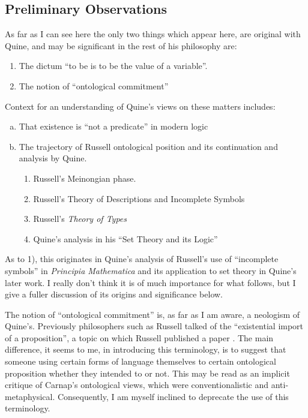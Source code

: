 \documentclass[10pt,titlepage]{book}
\begin{document}
\subsection{Preliminary Observations}
  
As far as I can see here the only two things which appear here, are original with Quine, and may be significant in the rest of his philosophy are:

\begin{enumerate}
\item The dictum ``to be is to be the value of a variable''.
\item The notion of ``ontological commitment'' 
\end{enumerate}

Context for an understanding of Quine's views on these matters includes:
\begin{enumerate}[(a)]
\item That existence is ``not a predicate'' in modern logic
\item The trajectory of Russell ontological position and its continuation and analysis by Quine. 
  \begin{enumerate}[i]
  \item Russell's Meinongian phase.
  \item Russell's Theory of Descriptions \cite{russell1956,russellOD} and Incomplete Symbols \cite{russell10}
  \item Russell's {\it Theory of Types} \cite{russell1908}
  \item Quine's analysis in his ``Set Theory and its Logic'' \cite{quineSTAIL}
  \end{enumerate}
\end{enumerate}

As to 1), this originates in Quine's analysis of Russell's use of ``incomplete symbols'' in \emph{Principia Mathematica} \cite{russell10} and its application to set theory in Quine's later work.
I really don't think it is of much importance for what follows, but I give a fuller discussion of its origins and significance below.

The notion of ``ontological commitment'' is, as far as I am aware, a neologism of Quine's.
Previously philosophers such as Russell talked of the ``existential import of a proposition'', a topic on which Russell published a paper \cite{russell-existential}.
The main difference, it seems to me, in introducing this terminology, is to suggest that someone using certain forms of language themselves to certain ontological proposition whether they intended to or not.
This may be read as an implicit critique of Carnap's ontological views, which were conventionalistic and anti-metaphysical.
Consequently, I am myself inclined to deprecate the use of this terminology.
\end{document}
